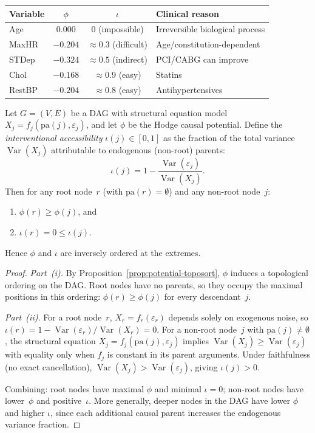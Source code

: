 \documentclass[twoside,11pt]{article}
\DeclareMathOperator{\Var}{Var}
\begin{document}
\begin{center}
\begin{tabular}{lccl}
\toprule
Variable & $\phi$ & $\iota$ & Clinical reason \\
\midrule
Age & $0.000$ & 0 (impossible) & Irreversible biological process \\
MaxHR & $-0.204$ & $\approx 0.3$ (difficult) & Age/constitution-dependent \\
STDep & $-0.324$ & $\approx 0.5$ (indirect) & PCI/CABG can improve \\
Chol & $-0.168$ & $\approx 0.9$ (easy) & Statins \\
RestBP & $-0.204$ & $\approx 0.8$ (easy) & Antihypertensives \\
\bottomrule
\end{tabular}
\end{center}

\begin{proposition}
\label{prop:potential-intervention}
Let $G=(V,E)$ be a DAG with structural equation model
$X_j=f_j(\mathrm{pa}(j),\varepsilon_j)$, and let $\phi$ be the
Hodge causal potential.  Define the \emph{interventional accessibility}
$\iota(j)\in[0,1]$ as the fraction of the total variance
$\Var(X_j)$ attributable to endogenous (non-root) parents:
\[
  \iota(j) = 1 - \frac{\Var(\varepsilon_j)}{\Var(X_j)}.
\]
Then for any root node~$r$ (with $\mathrm{pa}(r)=\emptyset$) and any
non-root node~$j$:
\begin{enumerate}
\item[\emph{(i)}] $\phi(r)\ge\phi(j)$, and
\item[\emph{(ii)}] $\iota(r)=0 \le \iota(j)$.
\end{enumerate}
Hence $\phi$ and $\iota$ are inversely ordered at the extremes.
\end{proposition}

\begin{proof}
\emph{Part~(i).}  By Proposition~\ref{prop:potential-toposort}, $\phi$
induces a topological ordering on the DAG.  Root nodes have no parents,
so they occupy the maximal positions in this ordering:
$\phi(r)\ge\phi(j)$ for every descendant~$j$.

\emph{Part~(ii).}  For a root node~$r$, $X_r=f_r(\varepsilon_r)$
depends solely on exogenous noise, so
$\iota(r) = 1 - \Var(\varepsilon_r)/\Var(X_r) = 0$.  For a non-root
node~$j$ with $\mathrm{pa}(j)\ne\emptyset$, the structural equation
$X_j=f_j(\mathrm{pa}(j),\varepsilon_j)$ implies $\Var(X_j) \ge
\Var(\varepsilon_j)$ with equality only when $f_j$ is constant in its
parent arguments.  Under faithfulness (no exact cancellation),
$\Var(X_j)>\Var(\varepsilon_j)$, giving $\iota(j)>0$.

Combining: root nodes have maximal $\phi$ and minimal $\iota=0$;
non-root nodes have lower~$\phi$ and positive~$\iota$.  More generally,
deeper nodes in the DAG have lower $\phi$ and higher $\iota$, since
each additional causal parent increases the endogenous variance
fraction.
\end{proof}
\end{document}

